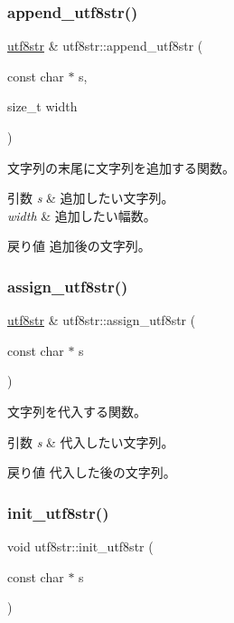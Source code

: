 \subsubsection{\texorpdfstring{append\+\_\+utf8str()}{append\_utf8str()}}
{\footnotesize\ttfamily \hyperlink{classutf8str}{utf8str} \& utf8str\+::append\+\_\+utf8str (\begin{DoxyParamCaption}\item[{const char $\ast$}]{s,  }\item[{size\+\_\+t}]{width }\end{DoxyParamCaption})}

文字列の末尾に文字列を追加する関数。 
\begin{DoxyParams}{引数}
{\em s} & 追加したい文字列。 \\
\hline
{\em width} & 追加したい幅数。 \\
\hline
\end{DoxyParams}
\begin{DoxyReturn}{戻り値}
追加後の文字列。 
\end{DoxyReturn}
\hypertarget{classutf8str_ada3fecdd9d8b8bffe810891e3510fe23}{}\label{classutf8str_ada3fecdd9d8b8bffe810891e3510fe23} 
\subsubsection{\texorpdfstring{assign\+\_\+utf8str()}{assign\_utf8str()}}
{\footnotesize\ttfamily \hyperlink{classutf8str}{utf8str} \& utf8str\+::assign\+\_\+utf8str (\begin{DoxyParamCaption}\item[{const char $\ast$}]{s }\end{DoxyParamCaption})}

文字列を代入する関数。 
\begin{DoxyParams}{引数}
{\em s} & 代入したい文字列。 \\
\hline
\end{DoxyParams}
\begin{DoxyReturn}{戻り値}
代入した後の文字列。 
\end{DoxyReturn}
\hypertarget{classutf8str_a5ef95f6ceb8fe7e0194d1f46b3a478a4}{}\label{classutf8str_a5ef95f6ceb8fe7e0194d1f46b3a478a4} 
\subsubsection{\texorpdfstring{init\+\_\+utf8str()}{init\_utf8str()}}
{\footnotesize\ttfamily void utf8str\+::init\+\_\+utf8str (\begin{DoxyParamCaption}\item[{const char $\ast$}]{s }\end{DoxyParamCaption})}

